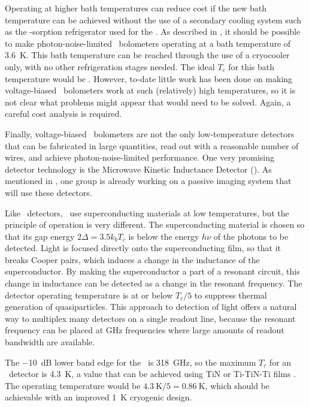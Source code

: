 Operating at higher bath temperatures can reduce cost if the new bath temperature can be achieved without the use of a secondary cooling system such as the -sorption refrigerator used for the \Imager.
As described in , it should be possible to make photon-noise-limited \TES\ bolometers operating at a bath temperature of \SI{3.6}{\K}.
This bath temperature can be reached through the use of a cryocooler only, with no other refrigeration stages needed. 
The ideal $T_c$ for this bath temperature would be .
However, to-date little work has been done on making voltage-biased \TES\ bolometers work at such (relatively) high temperatures, so it is not clear what problems might appear that would need to be solved.
Again, a careful cost analysis is required.

Finally, voltage-biased \TES\ bolometers are not the only low-temperature detectors that can be fabricated in large quantities, read out with a reasonable number of wires, and achieve photon-noise-limited performance.
One very promising detector technology is the Microwave Kinetic Inductance Detector (\MKID).
As mentioned in , one group is already working on a passive imaging system that will use these detectors.

Like \TES\ detectors, \MKIDs\ use superconducting materials at low temperatures, but the principle of operation is very different.
The superconducting material is chosen so that its gap energy $2 \Delta = 3.5 k_b T_c$ is below the energy $h \nu$ of the photons to be detected.
Light is focused directly onto the superconducting film, so that it breaks Cooper pairs, which induces a change in the inductance of the superconductor.
By making the superconductor a part of a resonant circuit, this change in inductance can be detected as a change in the resonant frequency.
The detector operating temperature is at or below $T_c / 5$ to suppress thermal generation of quasiparticles.
This approach to detection of light offers a natural way to multiplex many detectors on a single readout line, because the resonant frequency can be placed at \si{\GHz} frequencies where large amounts of readout bandwidth are available.

The \SI{-10}{\dB} lower band edge for the \Imager\ is \SI{318}{\GHz}, so the maximum $T_c$ for an \MKID\ detector is \SI{4.3}{\K}, a value that can be achieved using TiN or Ti-TiN-Ti films \cite{leduc_titanium_2010,vissers_proximity-coupled_2013}.
The operating temperature would be $\SI{4.3}{\K} / 5 = \SI{0.86}{\K}$, which should be achievable with an improved \SI{1}{\K} cryogenic design.

